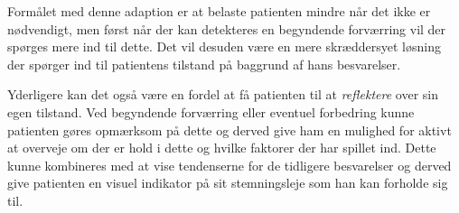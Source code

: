 Formålet med denne adaption er at belaste patienten mindre når det ikke er nødvendigt, men først når der kan detekteres en begyndende forværring vil der spørges mere ind til dette.
Det vil desuden være en mere skræddersyet løsning der spørger ind til patientens tilstand på baggrund af hans besvarelser.

Yderligere kan det også være en fordel at få patienten til at \emph{reflektere} over sin egen tilstand.
Ved begyndende forværring eller eventuel forbedring kunne patienten gøres opmærksom på dette og derved give ham en mulighed for aktivt at overveje om der er hold i dette og hvilke faktorer der har spillet ind.
Dette kunne kombineres med at vise tendenserne for de tidligere besvarelser og derved give patienten en visuel indikator på sit stemningsleje som han kan forholde sig til.